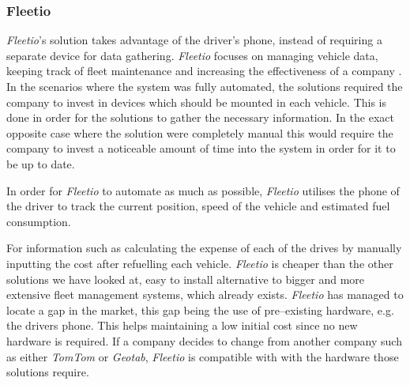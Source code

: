 \subsubsection{Fleetio}
\textit{Fleetio}'s solution takes advantage of the driver's phone, instead of requiring a separate device for data gathering.
\textit{Fleetio} focuses on managing vehicle data, keeping track of fleet maintenance and increasing the effectiveness of a company \cite{fleetio}.
In the scenarios where the system was fully automated, the solutions required the company to invest in devices which should be mounted in each vehicle.
This is done in order for the solutions to gather the necessary information.
In the exact opposite case where the solution were completely manual this would require the company to invest a noticeable amount of time into the system in order for it to be up to date.

In order for \textit{Fleetio} to automate as much as possible, \textit{Fleetio} utilises the phone of the driver to track the current position, speed of the vehicle and estimated fuel consumption.

For information such as calculating the expense of each of the drives by manually inputting the cost after refuelling each vehicle.
\textit{Fleetio} is cheaper than the other solutions we have looked at, easy to install alternative to bigger and more extensive fleet management systems, which already exists.
\textit{Fleetio} has managed to locate a gap in the market, this gap being the use of pre--existing hardware, e.g. the drivers phone.
This helps maintaining a low initial cost since no new hardware is required.
If a company decides to change from another company such as either \textit{TomTom} or \textit{Geotab}, \textit{Fleetio} is compatible with with the hardware those solutions require.
